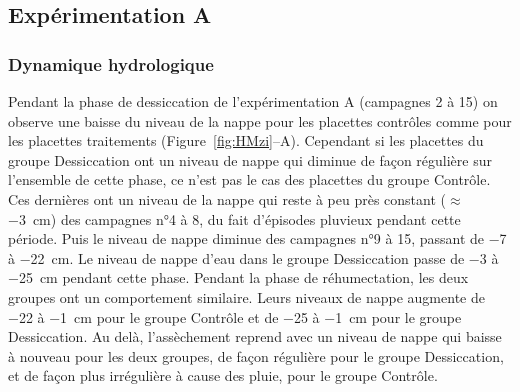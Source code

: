 \subsection{Expérimentation A}

\subsubsection{Dynamique hydrologique}


Pendant la phase de dessiccation de l'expérimentation A (campagnes 2 à 15) on observe une baisse du niveau de la nappe pour les placettes contrôles comme pour les placettes traitements (Figure~\ref{fig:HMzi}--A).
Cependant si les placettes du groupe Dessiccation ont un niveau de nappe qui diminue de façon régulière sur l'ensemble de cette phase, ce n'est pas le cas des placettes du groupe Contrôle.
Ces dernières ont un niveau de la nappe qui reste à peu près constant ($\approx$ \SI{-3}{\centi\metre}) des campagnes n°4 à 8, du fait d'épisodes pluvieux pendant cette période.
Puis le niveau de nappe diminue des campagnes n°9 à 15, passant de \num{-7} à \SI{-22}{\centi\metre}.
Le niveau de nappe d'eau dans le groupe Dessiccation passe de \num{-3} à \SI{-25}{\centi\metre} pendant cette phase.
Pendant la phase de réhumectation, les deux groupes ont un comportement similaire.
Leurs niveaux de nappe augmente de \num{-22} à \SI{-1}{\centi\metre} pour le groupe Contrôle et de \num{-25} à \SI{-1}{\centi\metre} pour le groupe Dessiccation.
Au delà, l'assèchement reprend avec un niveau de nappe qui baisse à nouveau pour les deux groupes, de façon régulière pour le groupe Dessiccation, et de façon plus irrégulière à cause des pluie, pour le groupe Contrôle.


